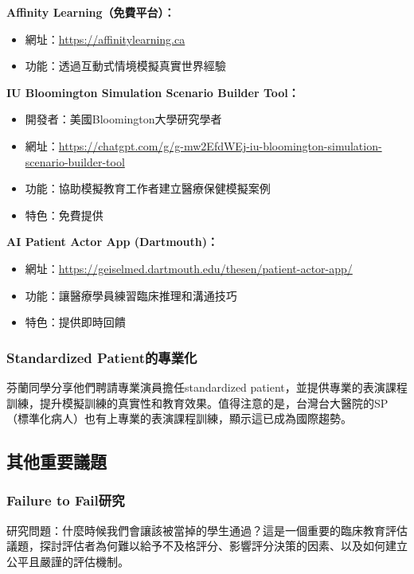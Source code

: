 \documentclass[12pt,a4paper]{article}
\begin{document}
\textbf{Affinity Learning（免費平台）：}
\begin{itemize}[nosep]
    \item 網址：\url{https://affinitylearning.ca}
    \item 功能：透過互動式情境模擬真實世界經驗
\end{itemize}

\textbf{IU Bloomington Simulation Scenario Builder Tool：}
\begin{itemize}[nosep]
    \item 開發者：美國Bloomington大學研究學者
    \item 網址：\url{https://chatgpt.com/g/g-mw2EfdWEj-iu-bloomington-simulation-scenario-builder-tool}
    \item 功能：協助模擬教育工作者建立醫療保健模擬案例
    \item 特色：免費提供
\end{itemize}

\textbf{AI Patient Actor App (Dartmouth)：}
\begin{itemize}[nosep]
    \item 網址：\url{https://geiselmed.dartmouth.edu/thesen/patient-actor-app/}
    \item 功能：讓醫療學員練習臨床推理和溝通技巧
    \item 特色：提供即時回饋
\end{itemize}


\subsubsection{Standardized Patient的專業化}

芬蘭同學分享他們聘請專業演員擔任standardized patient，並提供專業的表演課程訓練，提升模擬訓練的真實性和教育效果。值得注意的是，台灣台大醫院的SP（標準化病人）也有上專業的表演課程訓練，顯示這已成為國際趨勢。

\subsection{其他重要議題}

\subsubsection{Failure to Fail研究}

研究問題：什麼時候我們會讓該被當掉的學生通過？這是一個重要的臨床教育評估議題，探討評估者為何難以給予不及格評分、影響評分決策的因素、以及如何建立公平且嚴謹的評估機制。
\end{document}
